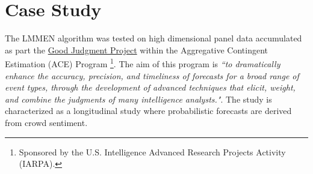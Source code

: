 \documentclass{article}
\begin{document}
\section{Case Study}
The LMMEN algorithm was tested on high dimensional panel data accumulated as part the \href{http://www.goodjudgmentproject.com/}{Good Judgment Project} within the Aggregative Contingent Estimation (ACE) Program \footnote{Sponsored by the U.S. Intelligence Advanced Research Projects Activity (IARPA).}. The aim of this program is \textit{``to dramatically enhance the accuracy, precision, and timeliness of forecasts for a broad range of event types, through the development of advanced techniques that elicit, weight, and combine the judgments of many intelligence analysts."}. The study is characterized as a longitudinal study where probabilistic forecasts are derived from crowd sentiment.
\end{document}
